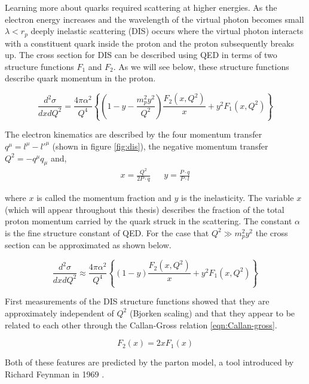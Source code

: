 Learning more about quarks required scattering at higher energies.  As the electron energy increases and the wavelength of the virtual photon becomes small $\lambda < r_p$ deeply inelastic scattering (DIS) occurs where the virtual photon interacts with a constituent quark inside the proton and the proton subsequently breaks up.  The cross section for DIS can be described using QED in terms of two structure functions $F_1$ and $F_2$.  As we will see below, these structure functions describe quark momentum in the proton.

\begin{equation}
	\label{eqn:sfs}
	\frac{d^2\sigma}{dx dQ^2} = \frac{4 \pi \alpha^2}{Q^4} \left\lbrace \left( 1 - y - \frac{m_p^2 y^2}{Q^2} \right) \frac{F_2(x,Q^2)}{x} + y^2 F_1 (x,Q^2) \right\rbrace
\end{equation}

The electron kinematics are described by the four momentum transfer $q^{\mu} = l^{\mu} - l'^{\mu}$ (shown in figure \ref{fig:dis}), the negative momentum transfer $Q^2 = - q^{\mu} q_{\mu}$ and,
\begin{align}  
  x = \frac{Q^{2}}{2P \cdot q} && y = \frac{P \cdot q}{P \cdot l} 
\end{align}

where $x$ is called the momentum fraction and $y$ is the inelasticity.  The variable $x$ (which will appear throughout this thesis) describes the fraction of the total proton momentum carried by the quark struck in the scattering.  The constant $\alpha$ is the fine structure constant of QED.  For the case that $Q^2 \gg m_p^2 y^2$ the cross section can be approximated as shown below.

\begin{equation}
	\label{eqn:sfs2}
	\frac{d^2\sigma}{dx dQ^2} \approx \frac{4 \pi \alpha^2}{Q^4} \left\lbrace \left( 1 - y \right) \frac{F_2(x,Q^2)}{x} + y^2 F_1 (x,Q^2) \right\rbrace
\end{equation}

First measurements of the DIS structure functions \cite{history-bjorken:1969} showed that they are approximately independent of $Q^2$ (Bjorken scaling) and that they appear to be related to each other through the Callan-Gross relation \ref{eqn:Callan-gross}.

\begin{equation}	
	F_{2} (x) = 2xF_1 (x)
	\label{eqn:callan-gross}
\end{equation}

Both of these features are predicted by the parton model, a tool introduced by Richard Feynman in 1969 \cite{history-feynman:1969}.

